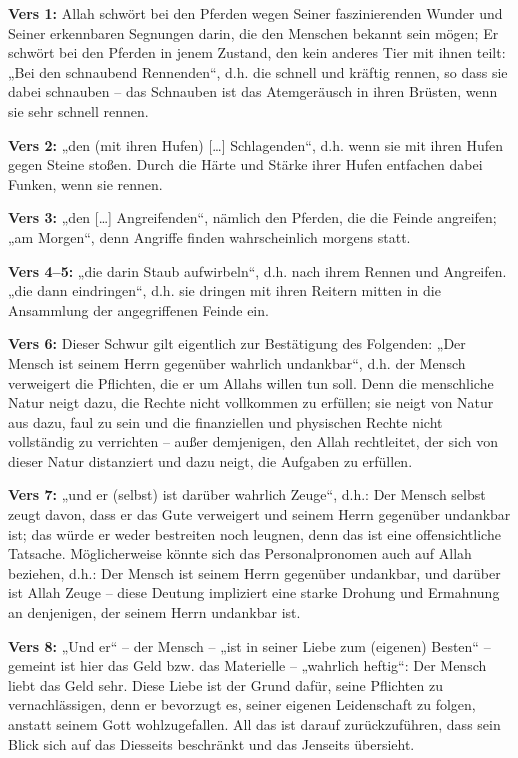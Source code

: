 \textbf{Vers 1:} Allah  schwört bei den Pferden wegen Seiner faszinierenden Wunder und
Seiner erkennbaren Segnungen darin, die den Menschen bekannt sein mögen; Er schwört bei
den Pferden in jenem Zustand, den kein anderes Tier mit ihnen teilt: „Bei den schnaubend
Rennenden“, d.h. die schnell und kräftig rennen, so dass sie dabei schnauben – das Schnauben
ist das Atemgeräusch in ihren Brüsten, wenn sie sehr schnell rennen.

\textbf{Vers 2:} „den (mit ihren Hufen) […] Schlagenden“, d.h. wenn sie mit ihren Hufen gegen
Steine stoßen. Durch die Härte und Stärke ihrer Hufen entfachen dabei Funken, wenn sie rennen.

\textbf{Vers 3:} „den […] Angreifenden“, nämlich den Pferden, die die Feinde angreifen; „am
Morgen“, denn Angriffe finden wahrscheinlich morgens statt.

\textbf{Vers 4–5:} „die darin Staub aufwirbeln“, d.h. nach ihrem Rennen und Angreifen. „die dann
eindringen“, d.h. sie dringen mit ihren Reitern mitten in die Ansammlung der angegriffenen
Feinde ein.

\textbf{Vers 6:} Dieser Schwur gilt eigentlich zur Bestätigung des Folgenden: „Der Mensch ist
seinem Herrn gegenüber wahrlich undankbar“, d.h. der Mensch verweigert die Pflichten, die er
um Allahs willen tun soll. Denn die menschliche Natur neigt dazu, die Rechte nicht vollkommen
zu erfüllen; sie neigt von Natur aus dazu, faul zu sein und die finanziellen und physischen
Rechte nicht vollständig zu verrichten – außer demjenigen, den Allah rechtleitet, der sich von
dieser Natur distanziert und dazu neigt, die Aufgaben zu erfüllen.

\textbf{Vers 7:} „und er (selbst) ist darüber wahrlich Zeuge“, d.h.: Der Mensch selbst zeugt davon,
dass er das Gute verweigert und seinem Herrn gegenüber undankbar ist; das würde er weder
bestreiten noch leugnen, denn das ist eine offensichtliche Tatsache. Möglicherweise könnte sich
das Personalpronomen auch auf Allah beziehen, d.h.: Der Mensch ist seinem Herrn gegenüber
undankbar, und darüber ist Allah Zeuge – diese Deutung impliziert eine starke Drohung und
Ermahnung an denjenigen, der seinem Herrn undankbar ist.

\textbf{Vers 8:} „Und er“ – der Mensch – „ist in seiner Liebe zum (eigenen) Besten“ – gemeint ist
hier das Geld bzw. das Materielle – „wahrlich heftig“: Der Mensch liebt das Geld sehr. Diese
Liebe ist der Grund dafür, seine Pflichten zu vernachlässigen, denn er bevorzugt es, seiner
eigenen Leidenschaft zu folgen, anstatt seinem Gott wohlzugefallen. All das ist darauf
zurückzuführen, dass sein Blick sich auf das Diesseits beschränkt und das Jenseits übersieht.

